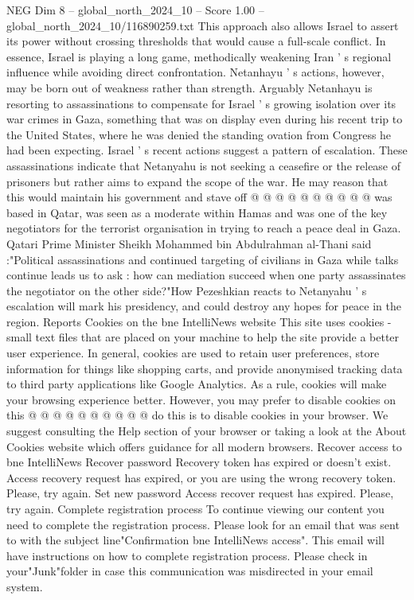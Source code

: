 \begin{textsample}{NEG Dim 8 – global\_north\_2024\_10 – Score 1.00 – global\_north\_2024\_10/116890259.txt}
This approach also allows Israel to assert its power without crossing thresholds that would cause a full-scale conflict.
In essence, Israel is playing a long game, methodically weakening Iran ' s regional influence while avoiding direct confrontation.
Netanhayu ' s actions, however, may be born out of weakness rather than strength.
Arguably Netanhayu is resorting to assassinations to compensate for Israel ' s growing isolation over its war crimes in Gaza, something that was on display even during his recent trip to the United States, where he was denied the standing ovation from Congress he had been expecting.
Israel ' s recent actions suggest a pattern of escalation.
These assassinations indicate that Netanyahu is not seeking a ceasefire or the release of prisoners but rather aims to expand the scope of the war.
He may reason that this would maintain his government and stave off @ @ @ @ @ @ @ @ @ @ was based in Qatar, was seen as a moderate within Hamas and was one of the key negotiators for the terrorist organisation in trying to reach a peace deal in Gaza.
Qatari Prime Minister Sheikh Mohammed bin Abdulrahman al-Thani said :"Political assassinations and continued targeting of civilians in Gaza while talks continue leads us to ask : how can mediation succeed when one party assassinates the negotiator on the other side?"How Pezeshkian reacts to Netanyahu ' s escalation will mark his presidency, and could destroy any hopes for peace in the region.
Reports Cookies on the bne IntelliNews website This site uses cookies - small text files that are placed on your machine to help the site provide a better user experience.
In general, cookies are used to retain user preferences, store information for things like shopping carts, and provide anonymised tracking data to third party applications like Google Analytics.
As a rule, cookies will make your browsing experience better.
However, you may prefer to disable cookies on this @ @ @ @ @ @ @ @ @ @ do this is to disable cookies in your browser.
We suggest consulting the Help section of your browser or taking a look at the About Cookies website which offers guidance for all modern browsers.
Recover access to bne IntelliNews Recover password Recovery token has expired or doesn't exist.
Access recovery request has expired, or you are using the wrong recovery token.
Please, try again.
Set new password Access recover request has expired.
Please, try again.
Complete registration process To continue viewing our content you need to complete the registration process.
Please look for an email that was sent to with the subject line"Confirmation bne IntelliNews access".
This email will have instructions on how to complete registration process.
Please check in your"Junk"folder in case this communication was misdirected in your email system.

\end{textsample}
